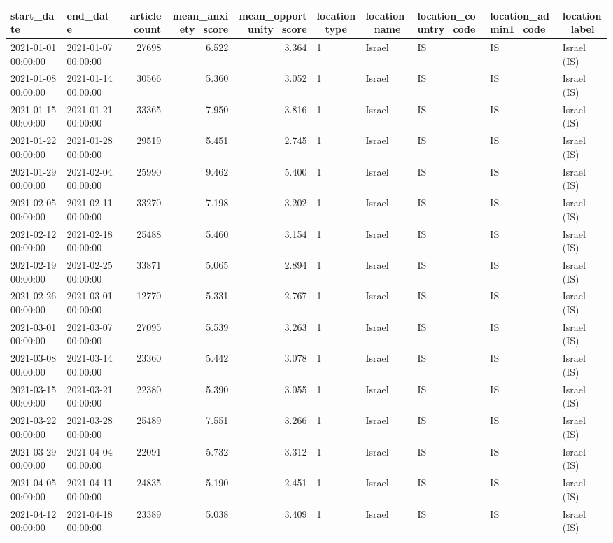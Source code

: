 \begin{tabular}{llrrrlllll}
\toprule
start\_date & end\_date & article\_count & mean\_anxiety\_score & mean\_opportunity\_score & location\_type & location\_name & location\_country\_code & location\_admin1\_code & location\_label \\
\midrule
2021-01-01 00:00:00 & 2021-01-07 00:00:00 & 27698 & 6.522 & 3.364 & 1 & Israel & IS & IS & Israel (IS) \\
2021-01-08 00:00:00 & 2021-01-14 00:00:00 & 30566 & 5.360 & 3.052 & 1 & Israel & IS & IS & Israel (IS) \\
2021-01-15 00:00:00 & 2021-01-21 00:00:00 & 33365 & 7.950 & 3.816 & 1 & Israel & IS & IS & Israel (IS) \\
2021-01-22 00:00:00 & 2021-01-28 00:00:00 & 29519 & 5.451 & 2.745 & 1 & Israel & IS & IS & Israel (IS) \\
2021-01-29 00:00:00 & 2021-02-04 00:00:00 & 25990 & 9.462 & 5.400 & 1 & Israel & IS & IS & Israel (IS) \\
2021-02-05 00:00:00 & 2021-02-11 00:00:00 & 33270 & 7.198 & 3.202 & 1 & Israel & IS & IS & Israel (IS) \\
2021-02-12 00:00:00 & 2021-02-18 00:00:00 & 25488 & 5.460 & 3.154 & 1 & Israel & IS & IS & Israel (IS) \\
2021-02-19 00:00:00 & 2021-02-25 00:00:00 & 33871 & 5.065 & 2.894 & 1 & Israel & IS & IS & Israel (IS) \\
2021-02-26 00:00:00 & 2021-03-01 00:00:00 & 12770 & 5.331 & 2.767 & 1 & Israel & IS & IS & Israel (IS) \\
2021-03-01 00:00:00 & 2021-03-07 00:00:00 & 27095 & 5.539 & 3.263 & 1 & Israel & IS & IS & Israel (IS) \\
2021-03-08 00:00:00 & 2021-03-14 00:00:00 & 23360 & 5.442 & 3.078 & 1 & Israel & IS & IS & Israel (IS) \\
2021-03-15 00:00:00 & 2021-03-21 00:00:00 & 22380 & 5.390 & 3.055 & 1 & Israel & IS & IS & Israel (IS) \\
2021-03-22 00:00:00 & 2021-03-28 00:00:00 & 25489 & 7.551 & 3.266 & 1 & Israel & IS & IS & Israel (IS) \\
2021-03-29 00:00:00 & 2021-04-04 00:00:00 & 22091 & 5.732 & 3.312 & 1 & Israel & IS & IS & Israel (IS) \\
2021-04-05 00:00:00 & 2021-04-11 00:00:00 & 24835 & 5.190 & 2.451 & 1 & Israel & IS & IS & Israel (IS) \\
2021-04-12 00:00:00 & 2021-04-18 00:00:00 & 23389 & 5.038 & 3.409 & 1 & Israel & IS & IS & Israel (IS) \\

\end{tabular}
